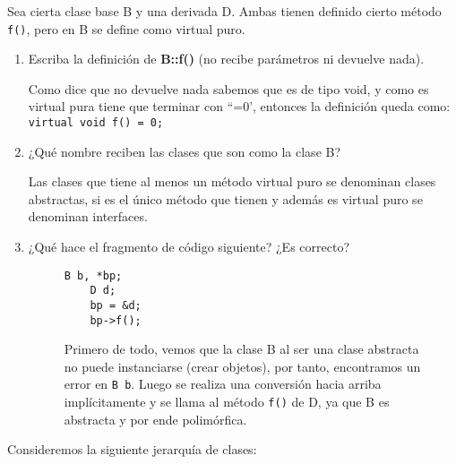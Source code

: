  Sea cierta clase base B y una derivada D. Ambas tienen definido cierto método \texttt{f()}, pero en B se define como virtual puro.
\begin{enumerate}[label = \alph*)]
  \item Escriba la definición de \textbf{B::f()} (no recibe parámetros ni
  devuelve nada).

  Como dice que no devuelve nada sabemos que es de tipo void, y como es virtual pura tiene que terminar con ``=0', entonces la definición queda como: \texttt{virtual void f() = 0;} 
  \item  ¿Qué nombre reciben las clases que son como la clase B?
  
  Las clases que tiene al menos un método virtual puro se denominan clases abstractas, si es el único método que tienen y además es virtual puro se denominan interfaces.
  \item ¿Qué hace el fragmento de código siguiente? ¿Es correcto?
 \begin{figure}[h]
  \begin{minipage}{0.25\textwidth}
    \begin{center}
      \begin{lstlisting}[frame = single]
    B b, *bp;
    D d;
    bp = &d;
    bp->f();
      \end{lstlisting}
    \end{center}
  \end{minipage}
  \hfill
  \begin{minipage}{0.7\textwidth}
    Primero de todo, vemos que la clase B al ser una clase abstracta no puede instanciarse (crear objetos), por tanto, encontramos un error en \texttt{B b}. Luego se realiza una conversión hacia arriba implícitamente y se llama al método \texttt{f()} de D, ya que B es abstracta y por ende polimórfica.
    
  \end{minipage}

 \end{figure}
\end{enumerate}
 Consideremos la siguiente jerarquía de clases:

